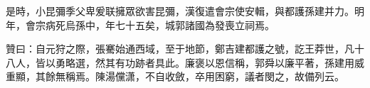 \begin{pinyinscope}
是時，小昆彌季父卑爰联擁眾欲害昆彌，漢復遣會宗使安輯，與都護孫建并力。明年，會宗病死烏孫中，年七十五矣，城郭諸國為發喪立祠焉。

贊曰：自元狩之際，張騫始通西域，至于地節，鄭吉建都護之號，訖王莽世，凡十八人，皆以勇略選，然其有功跡者具此。廉褒以恩信稱，郭舜以廉平著，孫建用威重顯，其餘無稱焉。陳湯儻潇，不自收斂，卒用困窮，議者閔之，故備列云。


\end{pinyinscope}